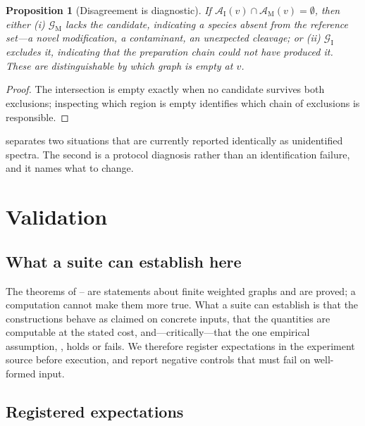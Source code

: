 \documentclass[11pt,a4paper]{article}
\newtheorem{proposition}[theorem]{Proposition}
\theoremstyle{definition}
\theoremstyle{remark}
\newcommand{\Gph}{\mathcal{G}}              %
\newcommand{\amb}{\mathcal{A}}               %
\begin{document}
\begin{proposition}[Disagreement is diagnostic]
\label{prop:disagree}
If $\amb_{\mathrm{I}}(v)\cap\amb_{\mathrm{M}}(v)=\emptyset$, then either
(i) $\Gph_{\mathrm{M}}$ lacks the candidate, indicating a species absent
from the reference set---a novel modification, a contaminant, an
unexpected cleavage; or (ii) $\Gph_{\mathrm{I}}$ excludes it, indicating
that the preparation chain could not have produced it. These are
distinguishable by which graph is empty at $v$.
\end{proposition}

\begin{proof}
The intersection is empty exactly when no candidate survives both
exclusions; inspecting which region is empty identifies which chain of
exclusions is responsible.
\end{proof}

 separates two situations that are currently reported
identically as unidentified spectra. The second is a protocol diagnosis
rather than an identification failure, and it names what to change.

\section{Validation}
\label{sec:validation}

\subsection{What a suite can establish here}

The theorems of -- are statements about
finite weighted graphs and are proved; a computation cannot make them
more true. What a suite can establish is that the constructions behave as
claimed on concrete inputs, that the quantities are computable at the
stated cost, and---critically---that the one empirical assumption,
, holds or fails. We therefore register expectations
in the experiment source before execution, and report negative controls
that must fail on well-formed input.

\subsection{Registered expectations}
\end{document}
